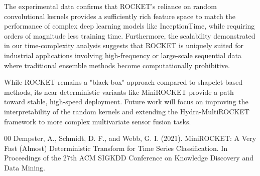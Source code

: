 \documentclass[conference]{IEEEtran}
\begin{document}
The experimental data confirms that ROCKET's reliance on random convolutional kernels provides a sufficiently rich feature space to match the performance of complex deep learning models like InceptionTime, while requiring orders of magnitude less training time. Furthermore, the scalability demonstrated in our time-complexity analysis suggests that ROCKET is uniquely suited for industrial applications involving high-frequency or large-scale sequential data where traditional ensemble methods become computationally prohibitive.

While ROCKET remains a "black-box" approach compared to shapelet-based methods, its near-deterministic variants like MiniROCKET provide a path toward stable, high-speed deployment. Future work will focus on improving the interpretability of the random kernels and extending the Hydra-MultiROCKET framework to more complex multivariate sensor fusion tasks.

\begin{thebibliography}{00}
 Dempster, A., Schmidt, D. F., and Webb, G. I. (2021). MiniROCKET: A Very Fast (Almost) Deterministic Transform for Time Series Classification. In Proceedings of the 27th ACM SIGKDD Conference on Knowledge Discovery and Data Mining.
\end{thebibliography}
\end{document}
